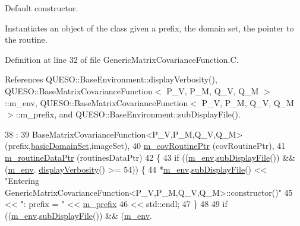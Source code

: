 Default constructor. 

Instantiates an object of the class given a prefix, the domain set, the pointer to the routine. 

Definition at line 32 of file Generic\-Matrix\-Covariance\-Function.\-C.



References Q\-U\-E\-S\-O\-::\-Base\-Environment\-::display\-Verbosity(), Q\-U\-E\-S\-O\-::\-Base\-Matrix\-Covariance\-Function$<$ P\-\_\-\-V, P\-\_\-\-M, Q\-\_\-\-V, Q\-\_\-\-M $>$\-::m\-\_\-env, Q\-U\-E\-S\-O\-::\-Base\-Matrix\-Covariance\-Function$<$ P\-\_\-\-V, P\-\_\-\-M, Q\-\_\-\-V, Q\-\_\-\-M $>$\-::m\-\_\-prefix, and Q\-U\-E\-S\-O\-::\-Base\-Environment\-::sub\-Display\-File().


\begin{DoxyCode}
38   : 
39   BaseMatrixCovarianceFunction<P\_V,P\_M,Q\_V,Q\_M>(prefix,\hyperlink{class_q_u_e_s_o_1_1_base_matrix_covariance_function_a6ce876e4dae5ab4b165ac100e310dd45}{basicDomainSet},imageSet),
40   \hyperlink{class_q_u_e_s_o_1_1_generic_matrix_covariance_function_a6841d2f9abbc3c31e0809c18d790777c}{m\_covRoutinePtr}                                     (covRoutinePtr),
41   \hyperlink{class_q_u_e_s_o_1_1_generic_matrix_covariance_function_a54dbb7157e6a1be651d6467a00d6a8cd}{m\_routineDataPtr}                                    (routinesDataPtr)
42 \{
43   \textcolor{keywordflow}{if} ((\hyperlink{class_q_u_e_s_o_1_1_base_matrix_covariance_function_a2bf98f6576db775109e240a2d828c578}{m\_env}.\hyperlink{class_q_u_e_s_o_1_1_base_environment_a8a0064746ae8dddfece4229b9ad374d6}{subDisplayFile}()) && (\hyperlink{class_q_u_e_s_o_1_1_base_matrix_covariance_function_a2bf98f6576db775109e240a2d828c578}{m\_env}.
      \hyperlink{class_q_u_e_s_o_1_1_base_environment_a1fe5f244fc0316a0ab3e37463f108b96}{displayVerbosity}() >= 54)) \{
44     *\hyperlink{class_q_u_e_s_o_1_1_base_matrix_covariance_function_a2bf98f6576db775109e240a2d828c578}{m\_env}.\hyperlink{class_q_u_e_s_o_1_1_base_environment_a8a0064746ae8dddfece4229b9ad374d6}{subDisplayFile}() << \textcolor{stringliteral}{"Entering
       GenericMatrixCovarianceFunction<P\_V,P\_M,Q\_V,Q\_M>::constructor()"}
45                             << \textcolor{stringliteral}{": prefix = "} << \hyperlink{class_q_u_e_s_o_1_1_base_matrix_covariance_function_a05865387f77ce48e71ab2448982c5616}{m\_prefix}
46                             << std::endl;
47   \}
48 
49   \textcolor{keywordflow}{if} ((\hyperlink{class_q_u_e_s_o_1_1_base_matrix_covariance_function_a2bf98f6576db775109e240a2d828c578}{m\_env}.\hyperlink{class_q_u_e_s_o_1_1_base_environment_a8a0064746ae8dddfece4229b9ad374d6}{subDisplayFile}()) && (\hyperlink{class_q_u_e_s_o_1_1_base_matrix_covariance_function_a2bf98f6576db775109e240a2d828c578}{m\_env}.

\end{DoxyCode}
